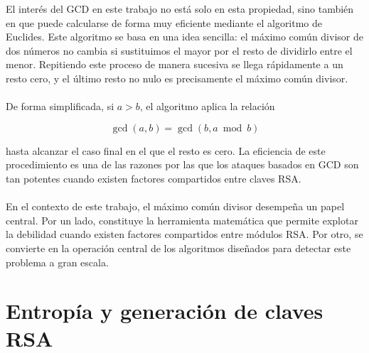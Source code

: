 El interés del GCD en este trabajo no está solo en esta propiedad, sino también en que puede calcularse de forma muy eficiente mediante el algoritmo de Euclides. Este algoritmo se basa en una idea sencilla: el máximo común divisor de dos números no cambia si sustituimos el mayor por el resto de dividirlo entre el menor. Repitiendo este proceso de manera sucesiva se llega rápidamente a un resto cero, y el último resto no nulo es precisamente el máximo común divisor.
\\
\\
De forma simplificada, si \(a>b\), el algoritmo aplica la relación

\[
\gcd(a,b)=\gcd(b,a \bmod b)
\]

hasta alcanzar el caso final en el que el resto es cero. La eficiencia de este procedimiento es una de las razones por las que los ataques basados en GCD son tan potentes cuando existen factores compartidos entre claves RSA.
\\
\\
En el contexto de este trabajo, el máximo común divisor desempeña un papel central. Por un lado, constituye la herramienta matemática que permite explotar la debilidad cuando existen factores compartidos entre módulos RSA. Por otro, se convierte en la operación central de los algoritmos diseñados para detectar este problema a gran escala.

\section{Entropía y generación de claves RSA}

